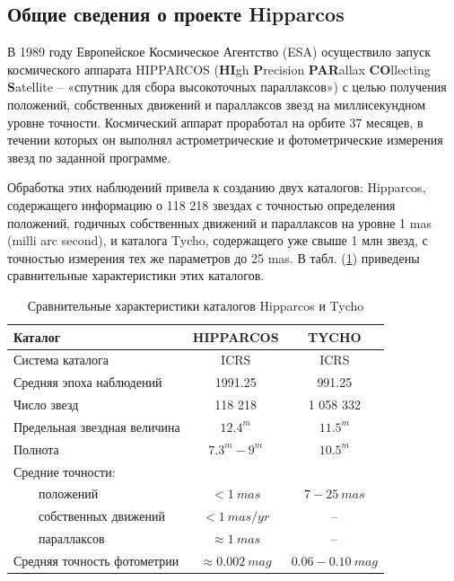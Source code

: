 \documentclass[14pt]{article} %
\begin{document}
\subsection{Общие сведения о проекте Hipparcos}\label{sub:smthhip}

В 1989 году Европейское Космическое Агентство (ESA) осуществило запуск космического аппарата HIPPARCOS (\textbf{HI}gh \textbf{P}recision \textbf{PAR}allax \textbf{CO}llecting \textbf{S}atellite – «спутник для сбора высокоточных параллаксов») с целью получения положений, собственных движений и параллаксов звезд на миллисекундном уровне точности. Космический аппарат проработал на орбите 37 месяцев, в течении которых он выполнял астрометрические и фотометрические измерения звезд по заданной программе.

Обработка этих наблюдений привела к созданию двух каталогов: Hipparcos, содержащего информацию о 118 218 звездах с точностью определения положений, годичных собственных движений и параллаксов на уровне 1 mas (milli arc second), и
каталога Tycho, содержащего уже свыше 1 млн звезд, с точностью измерения тех же параметров до 25 mas. В табл. (\ref{tabular:hip_tycho}) приведены сравнительные характеристики этих каталогов.

\begin{table}[h!]
\centering
\caption{Сравнительные характеристики каталогов
Hipparcos и Tycho}
\label{tabular:hip_tycho}
\begin{tabular}{|l|c|c|}
\hline 	
Каталог & HIPPARCOS & TYCHO\\
\hline
Система каталога & ICRS & ICRS\\
\hline 	
Средняя эпоха наблюдений & 1991.25 & 991.25\\
\hline 	
Число звезд & 118 218 & 1 058 332\\
\hline 	
Предельная звездная величина & $12.4^m$ & $11.5^m$\\
\hline 	
Полнота & $7.3^m - 9^m$ & $10.5^m$\\
\hline 	
Средние точности: & &\\
\hline 	
$\qquad$положений & $< 1~mas$ & $7-25~mas$\\
\hline 	
$\qquad$собственных движений & $< 1~mas/yr$ & --\\
\hline 	
$\qquad$параллаксов & $\approx 1~mas$ & --\\
\hline 	
Средняя точность фотометрии & $\approx 0.002~mag$ & $0.06 - 0.10~mag$\\
\hline 
\end{tabular}
\end{table}
\end{document}

